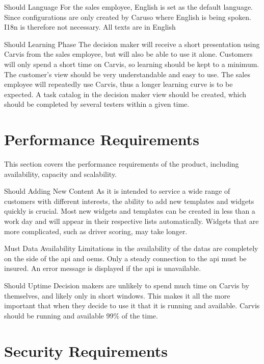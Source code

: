 {Should}
{Language}
{For the sales employee, English is set as the default language. Since configurations are only created by Caruso where English is being spoken. I18n is therefore not necessary.}
{All texts are in English}

{Should}
{Learning Phase}
{The decision maker will receive a short presentation using Carvis from the sales employee, but will also be able to use it alone. Customers will only spend a short time on Carvis, so learning should be kept to a minimum. The customer's view should be very understandable and easy to use. The sales employee will repeatedly use Carvis, thus a longer learning curve is to be expected.}
{A task catalog in the decision maker view should be created, which should be completed by several testers within a given time.}


\section{Performance Requirements}
This section covers the performance requirements of the product, including availability, capacity and scalability.

{Should}
{Adding New Content}
{As it is intended to service a wide range of customers with different interests, the ability to add new templates and widgets quickly is crucial.}
{Most new widgets and templates can be created in less than a work day and will appear in their respective lists automatically. Widgets that are more complicated, such as driver scoring, may take longer.}


{Must}
{Data Availability}
{Limitations in the availability of the \glspl{data} are completely on the side of the \gls{api} and \glspl{oem}. Only a steady connection to the \gls{api} must be insured.}
{An error message is displayed if the \gls{api} is unavailable.}

{Should}
{Uptime}
{Decision makers are unlikely to spend much time on Carvis by themselves, and likely only in short windows. This makes it all the more important that when they decide to use it that it is running and available.}
{Carvis should be running and available 99\% of the time.}


\section{Security Requirements}

